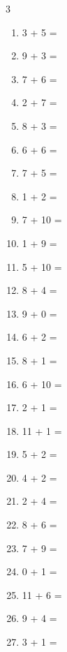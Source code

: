 \documentclass[a4paper, 11pt]{article}
\begin{document}
\begin{multicols}{3}
\begin{enumerate}
      \item 3 + 5 = \dotfill\bigskip
      \item 9 + 3 = \dotfill\bigskip
      \item 7 + 6 = \dotfill\bigskip
      \item 2 + 7 = \dotfill\bigskip
      \item 8 + 3 = \dotfill\bigskip
      \item 6 + 6 = \dotfill\bigskip
      \item 7 + 5 = \dotfill\bigskip
      \item 1 + 2 = \dotfill\bigskip
      \item 7 + 10 = \dotfill
      \item 1 + 9 = \dotfill\bigskip
      \item 5 + 10 = \dotfill\bigskip
      \item 8 + 4 = \dotfill\bigskip
      \item 9 + 0 = \dotfill\bigskip
      \item 6 + 2 = \dotfill\bigskip
      \item 8 + 1 = \dotfill\bigskip
      \item 6 + 10 = \dotfill\bigskip
      \item 2 + 1 = \dotfill\bigskip
      \item 11 + 1 = \dotfill\bigskip
      \item 5 + 2 = \dotfill\bigskip
      \item 4 + 2 = \dotfill\bigskip
      \item 2 + 4 = \dotfill\bigskip
      \item 8 + 6 = \dotfill\bigskip
      \item 7 + 9 = \dotfill\bigskip
      \item 0 + 1 = \dotfill\bigskip
      \item 11 + 6 = \dotfill\bigskip
      \item 9 + 4 = \dotfill\bigskip
      \item 3 + 1 = \dotfill
    \end{enumerate}
\end{multicols}
\end{document}
